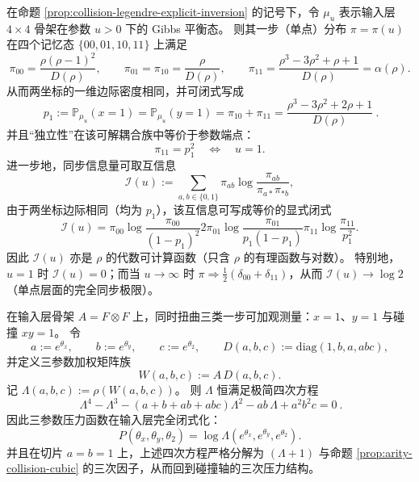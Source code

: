 \begin{proposition}\label{prop:collision-gibbs-one-site-mi}
在命题 \ref{prop:collision-legendre-explicit-inversion} 的记号下，令 \(\mu_u\) 表示输入层 \(4\times4\) 骨架在参数 \(u>0\) 下的 Gibbs 平衡态。
则其一步（单点）分布 \(\pi=\pi(u)\) 在四个记忆态 \(\{00,01,10,11\}\) 上满足
\[
\boxed{
\pi_{00}=\frac{\rho(\rho-1)^2}{D(\rho)},\qquad
\pi_{01}=\pi_{10}=\frac{\rho}{D(\rho)},\qquad
\pi_{11}=\frac{\rho^3-3\rho^2+\rho+1}{D(\rho)}=\alpha(\rho).
}
\]
从而两坐标的一维边际密度相同，并可闭式写成
\[
\boxed{\ p_1:=\mathbb P_{\mu_u}(x=1)=\mathbb P_{\mu_u}(y=1)=\pi_{10}+\pi_{11}
=\frac{\rho^3-3\rho^2+2\rho+1}{D(\rho)}\ }.
\]
并且“独立性”在该可解耦合族中等价于参数端点：
\[
\pi_{11}=p_1^2\quad\Longleftrightarrow\quad u=1.
\]
进一步地，同步信息量可取互信息
\[
\mathcal I(u):=\sum_{a,b\in\{0,1\}}\pi_{ab}\log\frac{\pi_{ab}}{\pi_{a\ast}\pi_{\ast b}},
\]
由于两坐标边际相同（均为 \(p_1\)），该互信息可写成等价的显式闭式
\[
\boxed{
\mathcal I(u)=
\pi_{00}\log\frac{\pi_{00}}{(1-p_1)^2}
2\pi_{01}\log\frac{\pi_{01}}{p_1(1-p_1)}
\pi_{11}\log\frac{\pi_{11}}{p_1^2}.
}
\]
因此 \(\mathcal I(u)\) 亦是 \(\rho\) 的代数可计算函数（只含 \(\rho\) 的有理函数与对数）。
特别地，\(u=1\) 时 \(\mathcal I(u)=0\)；而当 \(u\to\infty\) 时 \(\pi\Rightarrow \tfrac12(\delta_{00}+\delta_{11})\)，从而 \(\mathcal I(u)\to \log 2\)（单点层面的完全同步极限）。
\end{proposition}

\begin{proposition}\label{prop:collision-input-3param-quartic}
在输入层骨架 \(A=F\otimes F\) 上，同时扭曲三类一步可加观测量：\(x=1\)、\(y=1\) 与碰撞 \(xy=1\)。
令
\[
a:=e^{\theta_x},\qquad b:=e^{\theta_y},\qquad c:=e^{\theta_2},
\qquad
D(a,b,c):=\mathrm{diag}(1,b,a,abc),
\]
并定义三参数加权矩阵族
\[
W(a,b,c):=A\,D(a,b,c).
\]
记 \(\Lambda(a,b,c):=\rho(W(a,b,c))\)。
则 \(\Lambda\) 恒满足极简四次方程
\[
\boxed{\ \Lambda^4-\Lambda^3-(a+b+ab+abc)\Lambda^2-ab\,\Lambda+a^2b^2c=0\ }.
\]
因此三参数压力函数在输入层完全闭式化：
\[
P(\theta_x,\theta_y,\theta_2)=\log \Lambda(e^{\theta_x},e^{\theta_y},e^{\theta_2}).
\]
并且在切片 \(a=b=1\) 上，上述四次方程严格分解为 \((\Lambda+1)\) 与命题 \ref{prop:arity-collision-cubic} 的三次因子，从而回到碰撞轴的三次压力结构。
\end{proposition}

